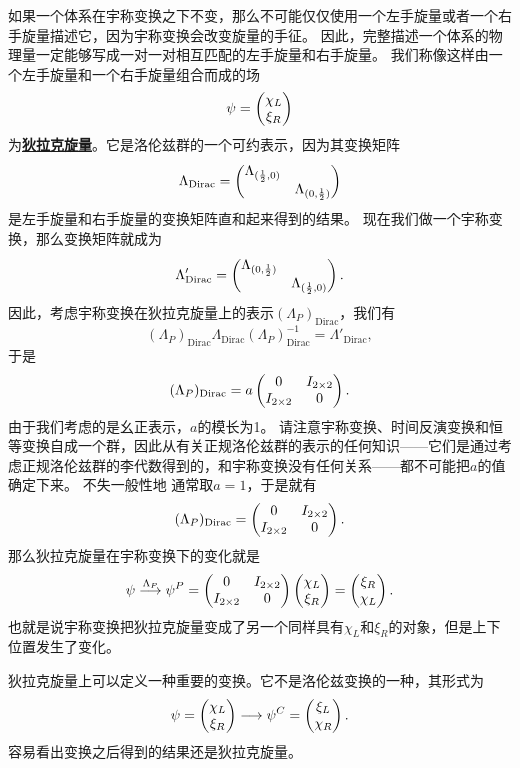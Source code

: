 \documentclass[hyperref, UTF8, a4paper]{ctexart}
\newcommand{\concept}[1]{\underline{\textbf{#1}}}
\begin{document}
如果一个体系在宇称变换之下不变，那么不可能仅仅使用一个左手旋量或者一个右手旋量描述它，因为宇称变换会改变旋量的手征。
因此，完整描述一个体系的物理量一定能够写成一对一对相互匹配的左手旋量和右手旋量。
我们称像这样由一个左手旋量和一个右手旋量组合而成的场
\begin{equation}
    \psi = \pmqty{\chi_L \\ \xi_R}
\end{equation}
为\concept{狄拉克旋量}。它是洛伦兹群的一个可约表示，因为其变换矩阵
\begin{equation}
    \Lambda_\text{Dirac} = \pmqty{\dmat{\Lambda_{(\frac{1}{2}, 0)}, \Lambda_{(0, \frac{1}{2})}}}
\end{equation}
是左手旋量和右手旋量的变换矩阵直和起来得到的结果。
现在我们做一个宇称变换，那么变换矩阵就成为
\[
    \Lambda'_\text{Dirac} = \pmqty{\dmat{\Lambda_{(0, \frac{1}{2})}, \Lambda_{(\frac{1}{2}, 0)}}}.
\]
因此，考虑宇称变换在狄拉克旋量上的表示$(\Lambda_P)_\text{Dirac}$，我们有
\[
    (\Lambda_P)_\text{Dirac} \Lambda_\text{Dirac} (\Lambda_P)_\text{Dirac}^{-1} = \Lambda'_\text{Dirac},
\]
于是
\[
    (\Lambda_P)_\text{Dirac} = a \pmqty{0 & I_{2\times 2} \\ I_{2 \times 2} & 0}.
\]
由于我们考虑的是幺正表示，$a$的模长为1。
请注意宇称变换、时间反演变换和恒等变换自成一个群，因此从有关正规洛伦兹群的表示的任何知识——它们是通过考虑正规洛伦兹群的李代数得到的，和宇称变换没有任何关系——都不可能把$a$的值确定下来。
不失一般性地%
通常取$a=1$，于是就有
\begin{equation}
    (\Lambda_P)_\text{Dirac} = \pmqty{0 & I_{2\times 2} \\ I_{2 \times 2} & 0}.
\end{equation}
那么狄拉克旋量在宇称变换下的变化就是
\begin{equation}
    \psi \stackrel{\Lambda_P}{\longrightarrow} \psi^P = \pmqty{0 & I_{2\times 2} \\ I_{2 \times 2} & 0} \pmqty{\chi_L \\ \xi_R} = \pmqty{\xi_R \\ \chi_L}.
\end{equation}
也就是说宇称变换把狄拉克旋量变成了另一个同样具有$\chi_L$和$\xi_R$的对象，但是上下位置发生了变化。

狄拉克旋量上可以定义一种重要的变换。它不是洛伦兹变换的一种，其形式为
\begin{equation}
    \psi = \pmqty{\chi_L \\ \xi_R} \longrightarrow \psi^C = \pmqty{\xi_L \\ \chi_R}.
\end{equation}
容易看出变换之后得到的结果还是狄拉克旋量。
\end{document}
